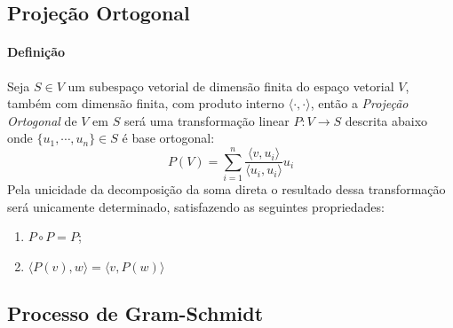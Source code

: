 \documentclass{article}
\begin{document}
        \subsection{Projeção Ortogonal}
            \paragraph{Definição}Seja $S \in V$ um subespaço vetorial de dimensão finita do espaço vetorial $V$, também com dimensão finita, com produto interno $\langle\cdot,\cdot\rangle$, então a \textit{Projeção Ortogonal} de $V$ em $S$ será uma transformação linear $P: V \rightarrow S$ descrita abaixo onde $\{u_{1}, \cdots, u_{n}\} \in S$ é base ortogonal:
                \[\boxed{P(V) = \sum\limits_{i = 1}^{n} \frac{\langle v, u_{i} \rangle}{\langle u_{i}, u_{i} \rangle} u_{i}}\]
            Pela unicidade da decomposição da soma direta o resultado dessa transformação será unicamente determinado, satisfazendo as seguintes propriedades:
                \begin{enumerate}[noitemsep]
                    \item $P \circ P = P$;
                    \item $\langle P(v), w\rangle = \langle v, P(w)\rangle$
                \end{enumerate}

        \subsection{Processo de Gram-Schmidt}
\end{document}
